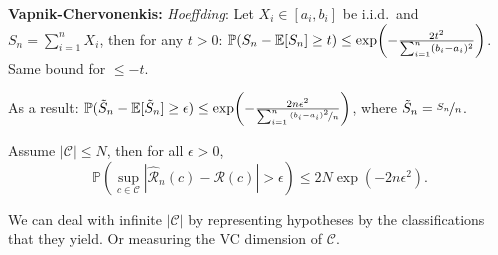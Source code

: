 \documentclass[9pt]{extarticle}
\newenvironment{topic}[1]
{\textbf{\sffamily \colorbox{black}{\rlap{\textbf{\textcolor{white}{#1}}}\hspace{\linewidth}\hspace{-2\fboxsep}}}}
{}
\newenvironment{subtopic}[1]
{\textbf{\sffamily #1:}}
{}
\begin{document}
\begin{multicols*}{3}
\begin{topic}{Statistical learning theory}
\begin{subtopic}{Vapnik-Chervonenkis}
            \textit{Hoeffding}: Let $X_i \in [a_i, b_i]$ be i.i.d.\ and $S_n = \sum_{i=1}^{n} X_i$, then for any $t >
                0$: $\mathbb{P}(S_n - \E[S_n] \geq t) \leq \exp \lft( -\frac{2t^2}{\sum_{i=1}^{n} (b_i - a_i)^2} \rgt)$.
            Same bound for $\leq -t$.

            As a result: $\mathbb{P}(\tilde{S}_n - \E[\tilde{S}_n] \geq \epsilon) \leq \exp \lft( -\frac{2n
                    \epsilon^2}{\sum_{i=1}^{n} \nicefrac{(b_i - a_i)^2}{n}} \rgt)$, where $\tilde{S}_n =
                \nicefrac{S_n}{n}$.

            Assume $|\mathcal{C}| \leq N$, then for all $\epsilon > 0$, \[
                \mathbb{P}(\sup_{c \in \mathcal{C}} |\hat{\mathcal{R}}_n(c) - \mathcal{R}(c)| > \epsilon) \leq 2N\exp(-2n \epsilon^2).
            \]

            We can deal with infinite $|\mathcal{C}|$ by representing hypotheses by the classifications that
            they yield. Or measuring the VC dimension of $\mathcal{C}$.

        \end{subtopic}

    \end{topic}

\end{multicols*}
\end{document}
